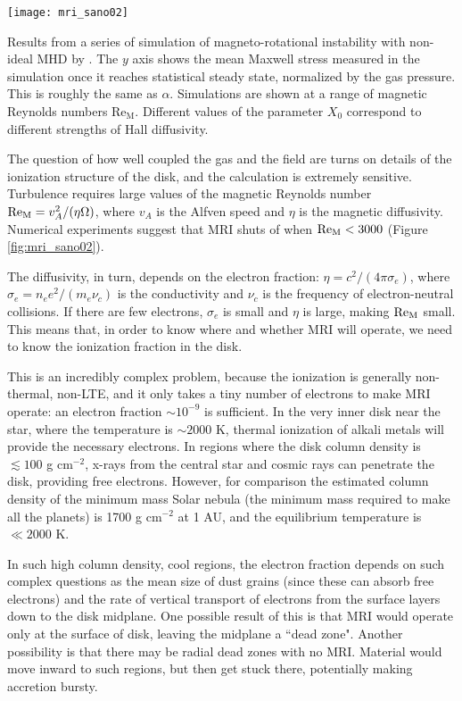 \begin{marginfigure}
\texttt{[image: mri\_sano02]}
\caption[Maxwell stress in non-ideal MHD simulations of the MRI]{
\label{fig:mri_sano02}
Results from a series of simulation of magneto-rotational instability with non-ideal MHD by \citet{sano02a}. The $y$ axis shows the mean Maxwell stress measured in the simulation once it reaches statistical steady state, normalized by the gas pressure. This is roughly the same as $\alpha$. Simulations are shown at a range of magnetic Reynolds numbers $\mbox{Re}_{\mathrm{M}}$. Different values of the parameter $X_0$ correspond to different strengths of Hall diffusivity.
}
\end{marginfigure}

The question of how well coupled the gas and the field are turns on details of the ionization structure of the disk, and the calculation is extremely sensitive. Turbulence requires large values of the magnetic Reynolds number $\mbox{Re}_{\rm M} = v_A^2 /(\eta\Omega)$, where $v_A$ is the Alfven speed and $\eta$ is the magnetic diffusivity. Numerical experiments suggest that MRI shuts of when $\mbox{Re}_{\rm M} < 3000$ (Figure \ref{fig:mri_sano02}).

The diffusivity, in turn, depends on the electron fraction: $\eta = c^2/(4\pi \sigma_e)$, where $\sigma_e = n_e e^2/(m_e \nu_c)$ is the conductivity and $\nu_c$ is the frequency of electron-neutral collisions. If there are few electrons, $\sigma_e$ is small and $\eta$ is large, making $\mbox{Re}_{\rm M}$ small. This means that, in order to know where and whether MRI will operate, we need to know the ionization fraction in the disk.

This is an incredibly complex problem, because the ionization is generally non-thermal, non-LTE, and it only takes a tiny number of electrons to make MRI operate: an electron fraction $\sim 10^{-9}$ is sufficient. In the very inner disk near the star, where the temperature is $\sim 2000$ K, thermal ionization of alkali metals will provide the necessary electrons. In regions where the disk column density is $\lesssim 100$ g cm$^{-2}$, x-rays from the central star and cosmic rays can penetrate the disk, providing free electrons. However, for comparison the estimated column density of the minimum mass Solar nebula (the minimum mass required to make all the planets) is 1700 g cm$^{-2}$ at 1 AU, and the equilibrium temperature is $\ll 2000$ K.

In such high column density, cool regions, the electron fraction depends on such complex questions as the mean size of dust grains (since these can absorb free electrons) and the rate of vertical transport of electrons from the surface layers down to the disk midplane. One possible result of this is that MRI would operate only at the surface of disk, leaving the midplane a ``dead zone". Another possibility is that there may be radial dead zones with no MRI. Material would move inward to such regions, but then get stuck there, potentially making accretion bursty.

